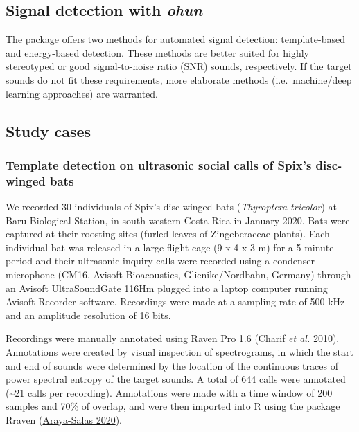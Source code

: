 \documentclass[
]{article}
\begin{document}
\hypertarget{signal-detection-with-ohun}{%
\subsection{\texorpdfstring{Signal detection with
\emph{ohun}}{Signal detection with ohun}}\label{signal-detection-with-ohun}}

The package offers two methods for automated signal detection:
template-based and energy-based detection. These methods are better
suited for highly stereotyped or good signal-to-noise ratio (SNR)
sounds, respectively. If the target sounds do not fit these
requirements, more elaborate methods (i.e.~machine/deep learning
approaches) are warranted.

\hypertarget{study-cases}{%
\subsection{Study cases}\label{study-cases}}

\hypertarget{template-detection-on-ultrasonic-social-calls-of-spixs-disc-winged-bats}{%
\subsubsection{Template detection on ultrasonic social calls of Spix's
disc-winged
bats}\label{template-detection-on-ultrasonic-social-calls-of-spixs-disc-winged-bats}}

We recorded 30 individuals of Spix's disc-winged bats (\emph{Thyroptera
tricolor}) at Baru Biological Station, in south-western Costa Rica in
January 2020. Bats were captured at their roosting sites (furled leaves
of Zingeberaceae plants). Each individual bat was released in a large
flight cage (9 x 4 x 3 m) for a 5-minute period and their ultrasonic
inquiry calls were recorded using a condenser microphone (CM16, Avisoft
Bioacoustics, Glienike/Nordbahn, Germany) through an Avisoft
UltraSoundGate 116Hm plugged into a laptop computer running
Avisoft-Recorder software. Recordings were made at a sampling rate of
500 kHz and an amplitude resolution of 16 bits.

Recordings were manually annotated using Raven Pro 1.6
(\protect\hyperlink{ref-Charif2010}{Charif \emph{et al.} 2010}).
Annotations were created by visual inspection of spectrograms, in which
the start and end of sounds were determined by the location of the
continuous traces of power spectral entropy of the target sounds. A
total of 644 calls were annotated (\textasciitilde21 calls per
recording). Annotations were made with a time window of 200 samples and
70\% of overlap, and were then imported into R using the package Rraven
(\protect\hyperlink{ref-Araya-Salas2017e}{Araya-Salas 2020}).
\end{document}
